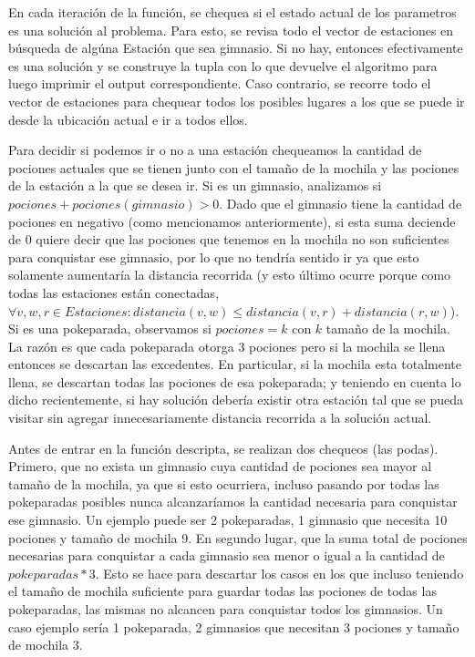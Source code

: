             En cada iteración de la función, se chequea si el estado actual de los parametros es una solución al problema. Para esto, se revisa todo el vector de estaciones en búsqueda de algúna Estación que sea gimnasio. Si no hay, entonces efectivamente es una solución y se construye la tupla con lo que devuelve el algoritmo para luego imprimir el output correspondiente. Caso contrario, se recorre todo el vector de estaciones para chequear todos los posibles lugares a los que se puede ir desde la ubicación actual e ir a todos ellos.

            Para decidir si podemos ir o no a una estación chequeamos la cantidad de pociones actuales que se tienen junto con el tamaño de la mochila y las pociones de la estación a la que se desea ir. Si es un gimnasio, analizamos si $pociones + pociones(gimnasio) > 0$. Dado que el gimnasio tiene la cantidad de pociones en negativo (como mencionamos anteriormente), si esta suma deciende de 0 quiere decir que las pociones que tenemos en la mochila no son suficientes para conquistar ese gimnasio, por lo que no tendría sentido ir ya que esto solamente aumentaría la distancia recorrida (y esto último ocurre porque como todas las estaciones están conectadas,  $\forall v,w,r \in Estaciones : distancia(v,w) \leq distancia(v,r) + distancia(r,w)$). Si es una pokeparada, observamos si $pociones = k$ con $k$ tamaño de la mochila. La razón es que cada pokeparada otorga 3 pociones pero si la mochila se llena entonces se descartan las excedentes. En particular, si la mochila esta totalmente llena, se descartan todas las pociones de esa pokeparada; y teniendo en cuenta lo dicho recientemente, si hay solución debería existir otra estación tal que se pueda visitar sin agregar innecesariamente distancia recorrida a la solución actual.

            Antes de entrar en la función descripta, se realizan dos chequeos (las podas). Primero, que no exista un gimnasio cuya cantidad de pociones sea mayor al tamaño de la mochila, ya que si esto ocurriera, incluso pasando por todas las pokeparadas posibles nunca alcanzaríamos la cantidad necesaria para conquistar ese gimnasio. Un ejemplo puede ser 2 pokeparadas, 1 gimnasio que necesita 10 pociones y tamaño de mochila 9. En segundo lugar, que la suma total de pociones necesarias para conquistar a cada gimnasio sea menor o igual a la cantidad de $pokeparadas*3$. Esto se hace para descartar los casos en los que incluso teniendo el tamaño de mochila suficiente para guardar todas las pociones de todas las pokeparadas, las mismas no alcancen para conquistar todos los gimnasios. Un caso ejemplo sería 1 pokeparada, 2 gimnasios que necesitan 3 pociones y tamaño de mochila 3.


